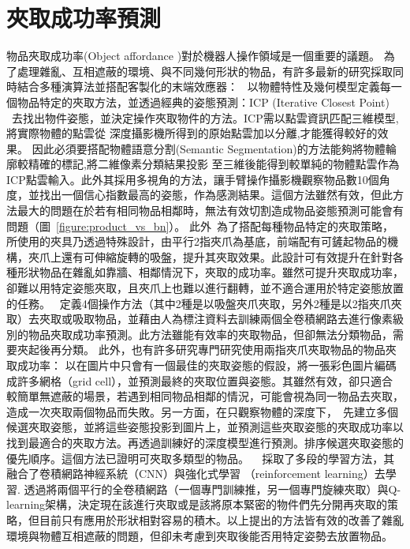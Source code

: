 \section{夾取成功率預測}
物品夾取成功率(Object affordance )對於機器人操作領域是一個重要的議題。
為了處理雜亂、互相遮蔽的環境、與不同幾何形狀的物品，有許多最新的研究採取同時結合多種演算法並搭配客製化的末端效應器：
~\cite{zeng2016multi}以物體特性及幾何模型定義每一個物品特定的夾取方法，並透過經典的姿態預測：ICP
(Iterative Closest Point) ~\cite{pomerleau2013comparing}去找出物件姿態，並決定操作夾取物件的方法。ICP需以點雲資訊匹配三維模型,將實際物體的點雲從
深度攝影機所得到的原始點雲加以分離,才能獲得較好的效果。 因此必須要搭配物體語意分割(Semantic
Segmentation)的方法能夠將物體輪廓較精確的標記,將二維像素分類結果投影
至三維後能得到較單純的物體點雲作為ICP點雲輸入。此外其採用多視角的方法，讓手臂操作攝影機觀察物品數10個角度，並找出一個信心指數最高的姿態，作為感測結果。這個方法雖然有效，但此方法最大的問題在於若有相同物品相鄰時，無法有效切割造成物品姿態預測可能會有問題（圖~\ref{figure:product_vs_bn}）。
此外~\cite{zeng2016multi}為了搭配每種物品特定的夾取策略，所使用的夾具乃透過特殊設計，由平行2指夾爪為基底，前端配有可鏟起物品的機構，夾爪上還有可伸縮旋轉的吸盤，提升其夾取效果。此設計可有效提升在針對各種形狀物品在雜亂如靠牆、相鄰情況下，夾取的成功率。雖然可提升夾取成功率，卻難以用特定姿態夾取，且夾爪上也難以進行翻轉，並不適合運用於特定姿態放置的任務。
~\cite{zeng2018robotic}定義4個操作方法（其中2種是以吸盤夾爪夾取，另外2種是以2指夾爪夾取）去夾取或吸取物品，並藉由人為標注資料去訓練兩個全卷積網路去進行像素級別的物品夾取成功率預測。此方法雖能有效率的夾取物品，但卻無法分類物品，需要夾起後再分類。
此外，也有許多研究專門研究使用兩指夾爪夾取物品的物品夾取成功率： \cite{redmon2015real} 以在圖片中只會有一個最佳的夾取姿態的假設，將一張彩色圖片編碼成許多網格（grid cell），並預測最終的夾取位置與姿態。其雖然有效，卻只適合較簡單無遮蔽的場景，若遇到相同物品相鄰的情況，可能會視為同一物品去夾取，造成一次夾取兩個物品而失敗。另一方面，在只觀察物體的深度下，~\cite{mahler2017dex}先建立多個候選夾取姿態，並將這些姿態投影到圖片上，並預測這些夾取姿態的夾取成功率以找到最適合的夾取方法。再透過訓練好的深度模型進行預測。排序候選夾取姿態的優先順序。這個方法已證明可夾取多類型的物品。
~\cite{pinto2016supersizing} 採取了多段的學習方法，其融合了卷積網路神經系統（CNN）與強化式學習 （reinforcement learning）去學習. \cite{zeng2018learning}透過將兩個平行的全卷積網路（一個專門訓練推，另一個專門旋練夾取）與Q-learning架構，決定現在該進行夾取或是該將原本緊密的物件們先分開再夾取的策略，但目前只有應用於形狀相對容易的積木。以上提出的方法皆有效的改善了雜亂環境與物體互相遮蔽的問題，但卻未考慮到夾取後能否用特定姿勢去放置物品。

